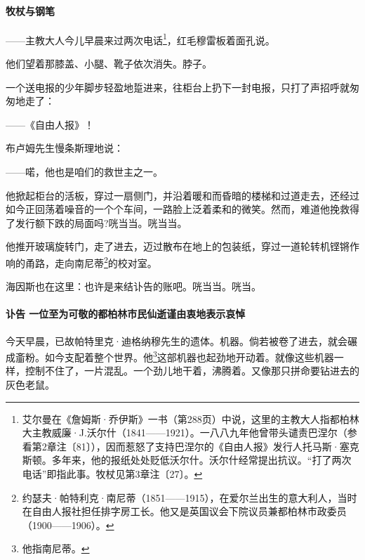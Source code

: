 \paragraph*{牧杖与钢笔}
\par ——主教大人今儿早晨来过两次电话\footnote{艾尔曼在《詹姆斯·乔伊斯》一书（第288页）中说，这里的主教大人指都柏林大主教威廉·J.沃尔什（1841——1921）。一八八九年他曾带头谴责巴涅尔（参看第2章注〔81〕），因而惹怒了支持巴涅尔的《自由人报》发行人托马斯·塞克斯顿。多年来，他的报纸处处贬低沃尔什。沃尔什经常提出抗议。“打了两次电话”即指此事。牧杖见第3章注〔27〕。}，红毛穆雷板着面孔说。
\par 他们望着那膝盖、小腿、靴子依次消失。脖子。
\par 一个送电报的少年脚步轻盈地踅进来，往柜台上扔下一封电报，只打了声招呼就匆匆地走了：
\par ——《自由人报》！
\par 布卢姆先生慢条斯理地说：
\par ——喏，他也是咱们的救世主之一。
\par 他掀起柜台的活板，穿过一扇侧门，并沿着暖和而昏暗的楼梯和过道走去，还经过如今正回荡着噪音的一个个车间，一路脸上泛着柔和的微笑。然而，难道他挽救得了发行额下跌的局面吗?咣当当。咣当当。
\par 他推开玻璃旋转门，走了进去，迈过散布在地上的包装纸，穿过一道轮转机铿锵作响的甬路，走向南尼蒂\footnote{约瑟夫·帕特利克·南尼蒂（1851——1915），在爱尔兰出生的意大利人，当时在自由人报社担任排字房工长。他又是英国议会下院议员兼都柏林市政委员（1900——1906）。}的校对室。
\par 海因斯也在这里：也许是来结讣告的账吧。咣当当。咣当。

\paragraph*{讣告 一位至为可敬的都柏林市民仙逝谨由衷地表示哀悼}
\par 今天早晨，已故帕特里克·迪格纳穆先生的遗体。机器。倘若被卷了进去，就会碾成齑粉。如今支配着整个世界。他\footnote{他指南尼蒂。}这部机器也起劲地开动着。就像这些机器一样，控制不住了，一片混乱。一个劲儿地干着，沸腾着。又像那只拼命要钻进去的灰色老鼠。

